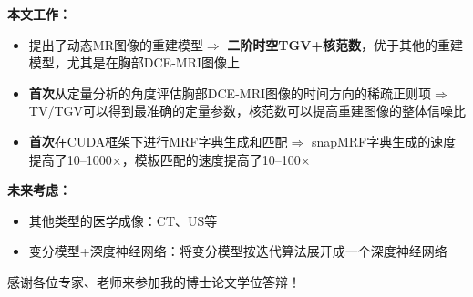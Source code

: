 \documentclass{beamer}
\begin{document}
\begin{frame}
\end{frame}

\begin{frame}
	\textbf{本文工作：}
	\begin{itemize}
		\item 提出了动态MR图像的重建模型$\Rightarrow$ \textbf{二阶时空TGV+核范数}，优于其他的重建模型，尤其是在胸部DCE-MRI图像上
		\item \textbf{首次}从定量分析的角度评估胸部DCE-MRI图像的时间方向的稀疏正则项$\Rightarrow$ TV/TGV可以得到最准确的定量参数，核范数可以提高重建图像的整体信噪比
		\item \textbf{首次}在CUDA框架下进行MRF字典生成和匹配$\Rightarrow$ snapMRF字典生成的速度提高了10--1000$\times$，模板匹配的速度提高了10--100$\times$
	\end{itemize}
	
	\textbf{未来考虑：}
	\begin{itemize}
		\item 其他类型的医学成像：CT、US等
		\item 变分模型+深度神经网络：将变分模型按迭代算法展开成一个深度神经网络
	\end{itemize}
\end{frame}



\begin{frame}
\centerline{感谢各位专家、老师来参加我的博士论文学位答辩！}
\end{frame}

\end{document}
